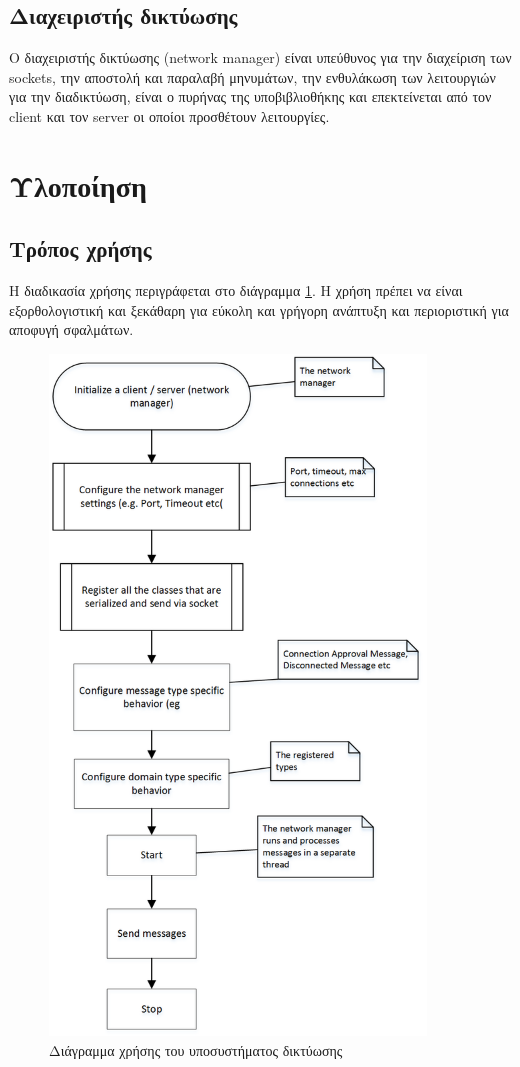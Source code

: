 		\subsection{Διαχειριστής δικτύωσης}
		Ο διαχειριστής δικτύωσης (network manager) είναι υπεύθυνος για την διαχείριση των sockets, την αποστολή και παραλαβή μηνυμάτων, την ενθυλάκωση των λειτουργιών για την διαδικτύωση, είναι ο πυρήνας της υποβιβλιοθήκης και επεκτείνεται από τον client και τον server οι οποίοι προσθέτουν λειτουργίες.
			
		\section{Υλοποίηση}	
		\subsection{Τρόπος χρήσης}
		Η διαδικασία χρήσης περιγράφεται στο διάγραμμα \ref{fig:Network_Usage_Diagram}. Η χρήση πρέπει να είναι εξορθολογιστική και ξεκάθαρη για εύκολη και γρήγορη ανάπτυξη και περιοριστική για αποφυγή σφαλμάτων.
		\begin{figure}
			\centering
			\includegraphics[width=100mm]{Images/network_usage_diagram}
			\caption{Διάγραμμα χρήσης του υποσυστήματος δικτύωσης}
			\label{fig:Network_Usage_Diagram}
		\end{figure}	
					
